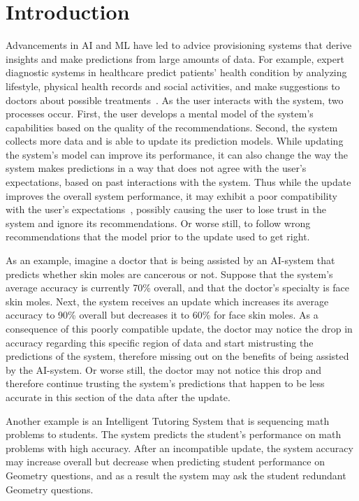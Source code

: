 \documentclass[letterpaper]{article} %
\theoremstyle{definition}
\begin{document}
\section{Introduction}
\label{sec:intro}
Advancements in AI and ML have led to advice provisioning systems that derive insights and make predictions from large amounts of data. For example, expert diagnostic systems in healthcare predict patients' health condition by analyzing lifestyle, physical health records and social activities, and make suggestions to doctors about possible treatments~\cite{sahoo2019deepreco}.
As the user interacts with the system, two processes occur. First, the user develops a mental model of the system's capabilities based on the quality of the recommendations. Second, the system collects more data and is able to update its prediction models. While updating the system's model can improve its performance, it can also change the way the system makes predictions in a way that does not agree with the user's expectations, based on past interactions with the system. Thus while the update improves the overall system performance, it may exhibit a poor compatibility with the user's expectations~\cite{bansal2019updates}, possibly causing the user to lose trust in the system and ignore its recommendations. Or worse still, to follow wrong recommendations that the model prior to the update used to get right.

As an example, imagine a doctor that is being assisted by an AI-system that predicts whether skin moles are cancerous or not. Suppose that the system's average accuracy is currently 70\% overall, and that the doctor's specialty is face skin moles.
Next, the system  receives an update which increases its average accuracy to 90\% overall but decreases it to 60\% for face skin moles. As a consequence of this poorly compatible update, the doctor may notice the drop in accuracy regarding this specific region of data and start mistrusting the predictions of the system, therefore missing out on the benefits of being assisted by the AI-system.
Or worse still, the doctor may not notice this drop and therefore continue trusting the system's predictions that happen to be less accurate in this section of the data after the update.

Another example is an Intelligent Tutoring System that is sequencing math problems to students. The system predicts the student's performance on math problems with high accuracy. After an incompatible update, the system accuracy may increase overall but decrease when predicting student performance on Geometry questions, and as a result the system may ask the student redundant Geometry questions.
\end{document}
